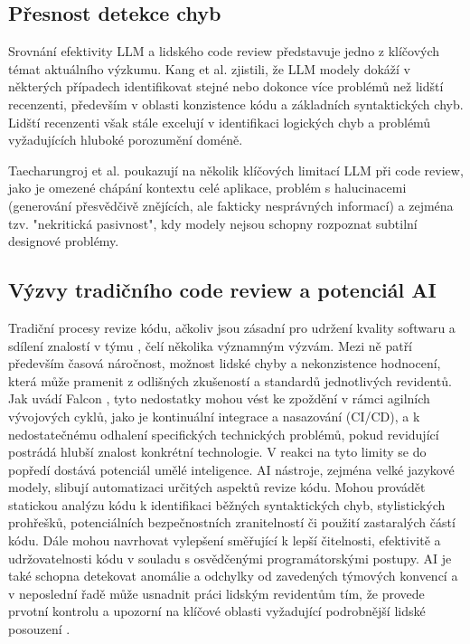 \documentclass[12pt, a4paper]{article}
\begin{document}
\subsection{Přesnost detekce chyb}
Srovnání efektivity LLM a lidského code review představuje jedno z klíčových témat aktuálního výzkumu. Kang et al. \cite{sun2025bitsaicrautomatedcodereview} zjistili, že LLM modely dokáží v některých případech identifikovat stejné nebo dokonce více problémů než lidští recenzenti, především v oblasti konzistence kódu a základních syntaktických chyb. Lidští recenzenti však stále excelují v identifikaci logických chyb a problémů vyžadujících hluboké porozumění doméně.

Taecharungroj et al. \cite{taecharungroj2023} poukazují na několik klíčových limitací LLM při code review, jako je omezené chápání kontextu celé aplikace, problém s halucinacemi (generování přesvědčivě znějících, ale fakticky nesprávných informací) a zejména tzv. "nekritická pasivnost", kdy modely nejsou schopny rozpoznat subtilní designové problémy.

\subsection{Výzvy tradičního code review a potenciál AI} %
Tradiční procesy revize kódu, ačkoliv jsou zásadní pro udržení kvality softwaru a sdílení znalostí v týmu \cite{zdrojak2022}, čelí několika významným výzvám. Mezi ně patří především časová náročnost, možnost lidské chyby a nekonzistence hodnocení, která může pramenit z odlišných zkušeností a standardů jednotlivých revidentů. Jak uvádí Falcon \cite{falcon2024devto}, tyto nedostatky mohou vést ke zpoždění v rámci agilních vývojových cyklů, jako je kontinuální integrace a nasazování (CI/CD), a k nedostatečnému odhalení specifických technických problémů, pokud revidující postrádá hlubší znalost konkrétní technologie.
V reakci na tyto limity se do popředí dostává potenciál umělé inteligence. AI nástroje, zejména velké jazykové modely, slibují automatizaci určitých aspektů revize kódu. Mohou provádět statickou analýzu kódu k identifikaci běžných syntaktických chyb, stylistických prohřešků, potenciálních bezpečnostních zranitelností či použití zastaralých částí kódu. Dále mohou navrhovat vylepšení směřující k lepší čitelnosti, efektivitě a udržovatelnosti kódu v souladu s osvědčenými programátorskými postupy. AI je také schopna detekovat anomálie a odchylky od zavedených týmových konvencí a v neposlední řadě může usnadnit práci lidským revidentům tím, že provede prvotní kontrolu a upozorní na klíčové oblasti vyžadující podrobnější lidské posouzení \cite{falcon2024devto}.
\end{document}

